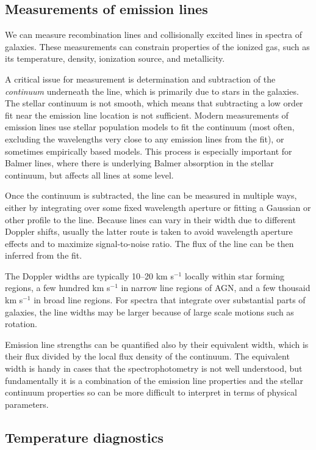 \subsection{Measurements of emission lines}

We can measure recombination lines and collisionally excited lines in
spectra of galaxies.  These measurements can constrain properties of
the ionized gas, such as its temperature, density, ionization source,
and metallicity.

A critical issue for measurement is determination and subtraction of
the {\it continuum} underneath the line, which is primarily due to
stars in the galaxies. The stellar continuum is not smooth, which
means that subtracting a low order fit near the emission line location
is not sufficient. Modern measurements of emission lines use stellar
population models to fit the continuum (most often, excluding the
wavelengths very close to any emission lines from the fit), or
sometimes empirically based models.  This process is especially
important for Balmer lines, where there is underlying Balmer
absorption in the stellar continuum, but affects all lines at some
level.

Once the continuum is subtracted, the line can be measured in multiple
ways, either by integrating over some fixed wavelength aperture or
fitting a Gaussian or other profile to the line. Because lines can
vary in their width due to different Doppler shifts, usually the
latter route is taken to avoid wavelength aperture effects and to
maximize signal-to-noise ratio. The flux of the line can be then
inferred from the fit.

The Doppler widths are typically 10--20 km s$^{-1}$ locally within
star forming regions, a few hundred km s$^{-1}$ in narrow line regions
of AGN, and a few thousaid km s$^{-1}$ in broad line regions. For
spectra that integrate over substantial parts of galaxies, the line
widths may be larger because of large scale motions such as rotation.

Emission line strengths can be quantified also by their equivalent
width, which is their flux divided by the local flux density of the
continuum. The equivalent width is handy in cases that the
spectrophotometry is not well understood, but fundamentally it is a
combination of the emission line properties and the stellar continuum
properties so can be more difficult to interpret in terms of physical
parameters.

\subsection{Temperature diagnostics}

